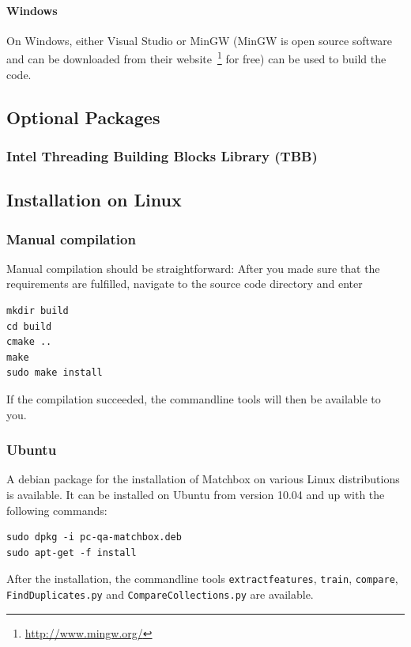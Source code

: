 \paragraph{Windows}

On Windows, either Visual Studio or 
MinGW (MinGW is open source software and can be downloaded from their website~\footnote{\url{http://www.mingw.org/}} for free) can be used to build
the code.

\subsection{Optional Packages}

\subsubsection{Intel Threading Building Blocks Library (TBB)}

\subsection{Installation on Linux}

\subsubsection{Manual compilation}
Manual compilation should be straightforward:
After you made sure that the requirements are fulfilled,
navigate to the source code directory and enter

\begin{verbatim}
mkdir build
cd build
cmake ..
make
sudo make install
\end{verbatim}

If the compilation succeeded, the commandline tools will then be available to you.

\subsubsection{Ubuntu}
A debian package for the installation of Matchbox on various Linux distributions is available.
It can be installed on Ubuntu from version 10.04 and up with the following commands:

\begin{verbatim}
sudo dpkg -i pc-qa-matchbox.deb
sudo apt-get -f install
\end{verbatim}

After the installation, the commandline tools \verb+extractfeatures+, \verb+train+,
\verb+compare+, \verb+FindDuplicates.py+ and \verb+CompareCollections.py+ are 
available.

